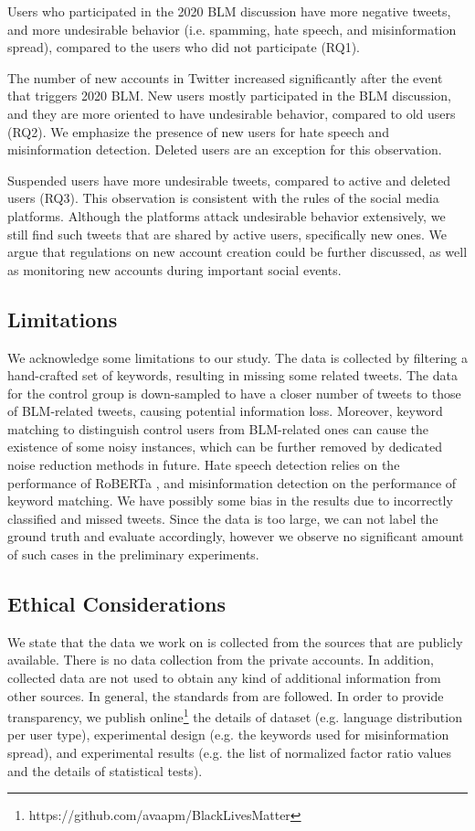 \documentclass[sigconf]{acmart}
\begin{document}
Users who participated in the 2020 BLM discussion have more negative tweets, and more undesirable behavior (i.e. spamming, hate speech, and misinformation spread), compared to the users who did not participate (RQ1).
    
The number of new accounts in Twitter increased significantly after the event that triggers 2020 BLM. New users mostly participated in the BLM discussion, and they are more oriented to have undesirable behavior, compared to old users (RQ2). We emphasize the presence of new users for hate speech and misinformation detection. Deleted users are an exception for this observation. 
    
Suspended users have more undesirable tweets, compared to active and deleted users (RQ3). This observation is consistent with the rules of the social media platforms. Although the platforms attack undesirable behavior extensively, we still find such tweets that are shared by active users, specifically new ones. We argue that regulations on new account creation could be further discussed, as well as monitoring new accounts during important social events.

\subsection{Limitations}
We acknowledge some limitations to our study. The data is collected by filtering a hand-crafted set of keywords, resulting in missing some related tweets. The data for the control group is down-sampled to have a closer number of tweets to those of BLM-related tweets, causing potential information loss. Moreover, keyword matching to distinguish control users from BLM-related ones can cause the existence of some noisy instances, which can be further removed by dedicated noise reduction methods in future. Hate speech detection relies on the performance of RoBERTa \cite{Liu:2019}, and misinformation detection on the performance of keyword matching. We have possibly some bias in the results due to incorrectly classified and missed tweets. Since the data is too large, we can not label the ground truth and evaluate accordingly, however we observe no significant amount of such cases in the preliminary experiments.

\subsection{Ethical Considerations}
We state that the data we work on is collected from the sources that are publicly available. There is no data collection from the private accounts. In addition, collected data are not used to obtain any kind of additional information from other sources. In general, the standards from \citet{Rivers:2014} are followed. In order to provide transparency, we publish online\footnote{https://github.com/avaapm/BlackLivesMatter} the details of dataset (e.g. language distribution per user type), experimental design (e.g. the keywords used for misinformation spread), and experimental results (e.g. the list of normalized factor ratio values and the details of statistical tests).
\end{document}
